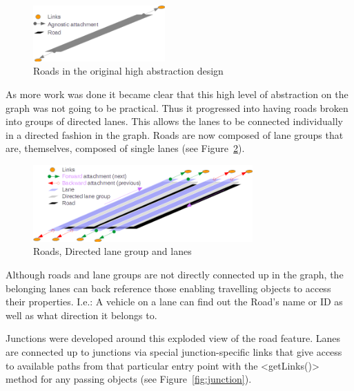 \begin{figure}[h]
    \vspace{1.5em}
    \caption{Roads in the original high abstraction design}
    \label{fig:RoadsOriginal}
    \centering
    \includegraphics[width=0.45\textwidth]{figs/graphConstruction/OriginalRoads.png}
    \vspace{1.5em}
\end{figure}

As more work was done it became clear that this high level of abstraction on the graph was not going to be practical. Thus it progressed into having roads broken into groups of directed lanes. This allows the lanes to be connected individually in a directed fashion in the graph. Roads are now composed of lane groups that are, themselves, composed of single lanes (see Figure~\ref{fig:RoadsFinal}).

\begin{figure}[h]
	\vspace{1.5em}
  	\caption{Roads, Directed lane group and lanes}
  	\label{fig:RoadsFinal}
  	\centering
	\includegraphics[width=0.75\textwidth]{figs/graphConstruction/Roads.png}
  	\vspace{1.5em}
\end{figure}	

Although roads and lane groups are not directly connected up in the graph, the belonging lanes can back reference those enabling travelling objects to access their properties. I.e.: A vehicle on a lane can find out the Road's name or ID as well as what direction it belongs to.

Junctions were developed around this exploded view of the road feature. Lanes are connected up to junctions via special junction-specific links that give access to available paths from that particular entry point with the <getLinks()> method for any passing objects (see Figure~\ref{fig:junction}).

